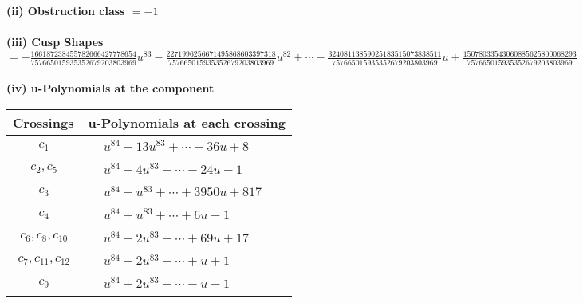 \documentclass[1p]{elsarticle_modified}
\theoremstyle{definition}
\begin{document}
\flushleft \textbf{(ii) Obstruction class $= -1$}\\~\\
\flushleft \textbf{(iii) Cusp Shapes $= -\frac{166187238455782666427778654}{757665015935352679203803969} u^{83}-\frac{2271996256671495868603397318}{757665015935352679203803969} u^{82}+\cdots-\frac{32408113859025183515073838511}{757665015935352679203803969} u+\frac{15078033543060885625800068293}{757665015935352679203803969}$}\\~\\
\newpage\renewcommand{\arraystretch}{1}
\flushleft \textbf{(iv) u-Polynomials at the component}\newline \\
\begin{tabular}{m{50pt}|m{274pt}}
Crossings & \hspace{64pt}u-Polynomials at each crossing \\
\hline $$\begin{aligned}c_{1}\end{aligned}$$&$\begin{aligned}
&u^{84}-13 u^{83}+\cdots-36 u+8
\end{aligned}$\\
\hline $$\begin{aligned}c_{2},c_{5}\end{aligned}$$&$\begin{aligned}
&u^{84}+4 u^{83}+\cdots-24 u-1
\end{aligned}$\\
\hline $$\begin{aligned}c_{3}\end{aligned}$$&$\begin{aligned}
&u^{84}- u^{83}+\cdots+3950 u+817
\end{aligned}$\\
\hline $$\begin{aligned}c_{4}\end{aligned}$$&$\begin{aligned}
&u^{84}+u^{83}+\cdots+6 u-1
\end{aligned}$\\
\hline $$\begin{aligned}c_{6},c_{8},c_{10}\end{aligned}$$&$\begin{aligned}
&u^{84}-2 u^{83}+\cdots+69 u+17
\end{aligned}$\\
\hline $$\begin{aligned}c_{7},c_{11},c_{12}\end{aligned}$$&$\begin{aligned}
&u^{84}+2 u^{83}+\cdots+u+1
\end{aligned}$\\
\hline $$\begin{aligned}c_{9}\end{aligned}$$&$\begin{aligned}
&u^{84}+2 u^{83}+\cdots- u-1
\end{aligned}$\\
\hline
\end{tabular}\\~\\
\end{document}
